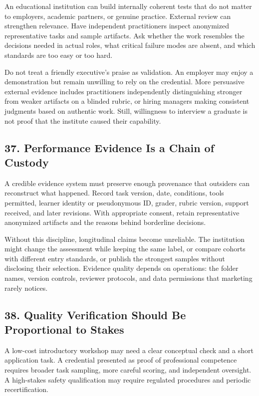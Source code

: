 An educational institution can build internally coherent tests that do not matter to employers, academic partners, or genuine practice. External review can strengthen relevance. Have independent practitioners inspect anonymized representative tasks and sample artifacts. Ask whether the work resembles the decisions needed in actual roles, what critical failure modes are absent, and which standards are too easy or too hard.

Do not treat a friendly executive's praise as validation. An employer may enjoy a demonstration but remain unwilling to rely on the credential. More persuasive external evidence includes practitioners independently distinguishing stronger from weaker artifacts on a blinded rubric, or hiring managers making consistent judgments based on authentic work. Still, willingness to interview a graduate is not proof that the institute caused their capability.

\subsection*{37. Performance Evidence Is a Chain of Custody}

A credible evidence system must preserve enough provenance that outsiders can reconstruct what happened. Record task version, date, conditions, tools permitted, learner identity or pseudonymous ID, grader, rubric version, support received, and later revisions. With appropriate consent, retain representative anonymized artifacts and the reasons behind borderline decisions.

Without this discipline, longitudinal claims become unreliable. The institution might change the assessment while keeping the same label, or compare cohorts with different entry standards, or publish the strongest samples without disclosing their selection. Evidence quality depends on operations: the folder names, version controls, reviewer protocols, and data permissions that marketing rarely notices.

\subsection*{38. Quality Verification Should Be Proportional to Stakes}

A low-cost introductory workshop may need a clear conceptual check and a short application task. A credential presented as proof of professional competence requires broader task sampling, more careful scoring, and independent oversight. A high-stakes safety qualification may require regulated procedures and periodic recertification.

